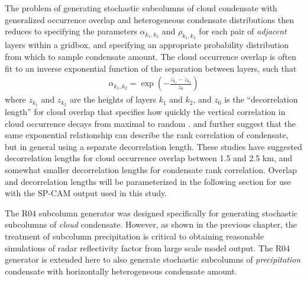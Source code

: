 The problem of generating stochastic subcolumns of cloud condensate with generalized occurrence overlap and heterogeneous condensate distributions then reduces to specifying the parameters $\alpha_{k_1, k_2}$ and $\rho_{k_1, k_2}$ for each pair of \emph{adjacent} layers within a gridbox, and specifying an appropriate probability distribution from which to sample condensate amount. The cloud occurrence overlap is often fit to an inverse exponential function of the separation  between layers, such that
\begin{gather}
    \alpha_{k_1, k_2} = \exp\left(-\frac{z_{k_1} - z_{k_2}}{z_0}\right)
    \label{alpha_exponential_equation}
\end{gather}
where $z_{k_1}$ and $z_{k_2}$ are the heights of layers $k_1$ and $k_2$, and $z_0$ is the ``decorrelation length'' for cloud overlap that specifies how quickly
the vertical correlation in cloud occurrence decays from maximal to random
\citep{hogan_and_illingworth_2000, mace_and_benson-troth_2002,
raisanen_et_al_2004, pincus_et_al_2005, barker_2008}. \cite{raisanen_et_al_2004} and \cite{pincus_et_al_2005} further
suggest that the same exponential relationship can describe the rank
correlation of condensate, but in general using a separate decorrelation length.
These studies have suggested decorrelation lengths for cloud occurrence overlap between 1.5 and 2.5 km, and somewhat smaller decorrelation lengths for condensate rank correlation. Overlap and decorrelation lengths will be parameterized in the following section for use with the SP-CAM output used in this study. 

The R04 subcolumn generator was designed specifically for generating stochastic subcolumns of \emph{cloud} condensate. However, as shown in the previous chapter, the treatment of subcolumn precipitation is critical to obtaining reasonable simulations of radar reflectivity factor from large scale model output. The R04 generator is extended here to also generate stochastic subcolumns of \emph{precipitation} condensate with horizontally heterogeneous condensate amount. %


